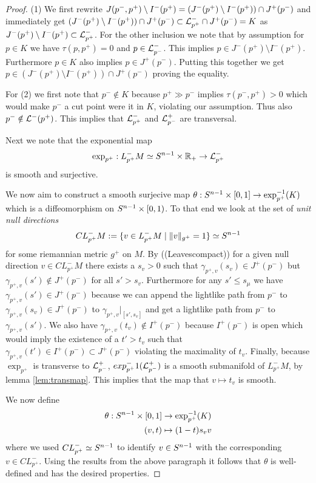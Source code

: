 \begin{proof}
(1) We first rewrite $J(p^-,p^+)\setminus I^-(p^+)=(J^-(p^+)\setminus I^-(p^+))\cap J^+(p^-)$ and immediately get $(J^-(p^+)\setminus I^-(p^+))\cap J^+(p^-)\subset \mathcal{L}^-_{p^+}\cap J^+(p^-)=K$ as $J^-(p^+)\setminus I^-(p^+)\subset \mathcal{L}^-_{p^+}$. For the other inclusion we note that by assumption for $p\in K$ we have $\tau(p,p^+)=0$ and $p\in \mathcal{L}_{p^-}^-$. This implies $p\in J^-(p^+)\setminus I^-(p^+)$. Furthermore $p\in K$ also implies $p\in J^+(p^-)$. Putting this together we get $p\in (J^-(p^+)\setminus I^-(p^+))\cap J^+(p^-)$ proving the equality.

For (2) we first note that $p^-\notin K$ because $p^+\gg p^-$ implies $\tau(p^-,p^+)>0$ which would make $p^-$ a cut point were it in $K$, violating our assumption. Thus also $p^-\notin \mathcal{L}^-(p^+)$. This implies that $\mathcal{L}^-_{p^+}$ and $\mathcal{L}^+_{p^-}$ are transversal.

Next we note that the exponential map
\[
    \exp_{p^+}:L^-_{p^+}M \simeq S^{n-1} \times \mathbb{R}_+ \to \mathcal{L}^-_{p^+}
\]
is smooth and surjective. 

We now aim to construct a smooth surjecive map $\theta:S^{n-1} \times [0,1] \to \exp^{-1}_{p^+}(K)$ which is a diffeomorphism on $S^{n-1} \times [0,1)$. To that end we look at the set of \emph{unit null directions} 
\[
    CL^-_{p^+}M:=\{v\in L^-_{p^+}M \mid \lVert v \rVert_{g^+}=1\}\simeq S^{n-1}
\] 
for some riemannian metric $g^+$ on $M$. By ((Leavescompact)) for a given null direction $v \in CL^-_{p^+}M$ there exists a $s_v>0$ such that $\gamma_{p^+,v}(s_v) \in J^+(p^-)$ but $\gamma_{p^+,v}(s') \notin J^+(p^-)$ for all $s'>s_v$. Furthermore for any $s'\le s_\mu$ we have $\gamma_{p^+,v}(s')\in J^+(p^-)$ because we can append the lightlike path from $p^-$ to $\gamma_{p^+,v}(s_v)\in J^+(p^-)$ to $\gamma_{p^+,v}\rvert_{[s',s_v]}$ and get a lightlike path from $p^-$ to $\gamma_{p^+,v}(s')$. We also have $\gamma_{p^+,v}(t_v)\notin I^+(p^-)$ because $I^+(p^-)$ is open which would imply the existence of a $t'>t_v$ such that $\gamma_{p^+,v}(t')\in I^+(p^-)\subset J^+(p^-)$ violating the maximality of $t_v$. Finally, because $\exp_{p^+}$ is transverse to $\mathcal{L}^+_{p^-}$, $exp_{p^+}^-1(\mathcal{L}^+_{p^-})$ is a smooth submanifold of $L^-_{p^+}M$, by lemma \ref{lem:transmap}. This implies that the map that $v\mapsto t_v$ is smooth.

We now define 
\begin{align*}
    \theta:S^{n-1}\times[0,1] &\to \exp^{-1}_{p^+}(K)\\
    (v,t)&\mapsto (1-t)s_vv
\end{align*}
where we used $CL^-_{p^+}\simeq S^{n-1}$ to identify $v\in S^{n-1}$ with the corresponding $v\in CL^-_{p^+}$.
Using the results from the above paragraph it follows that $\theta$ is well-defined and has the desired properties. 


\end{proof}
